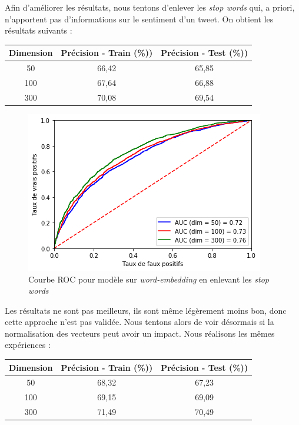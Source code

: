 \documentclass[11pt,french,french]{article}
\begin{document}
Afin d'améliorer les résultats, nous tentons d'enlever les \emph{stop
words} qui, a priori, n'apportent pas d'informations sur le sentiment
d'un tweet. On obtient les résultats suivants :

\begin{center}
\begin{tabular}{| c || c | c |}
\hline
Dimension & Précision - Train (\%)) & Précision - Test (\%)) \\ \hline
50 & 66,42 & 65,85 \\ \hline
100 & 67,64 & 66,88 \\ \hline
300 & 70,08 & 69,54 \\ \hline
\end{tabular}
\end{center}

\begin{figure}
\centering
\includegraphics{img/roc_word_st.png}
\caption{Courbe ROC pour modèle sur \emph{word-embedding} en enlevant
les \emph{stop words}}
\end{figure}

Les résultats ne sont pas meilleurs, ils sont même légèrement moins bon,
donc cette approche n'est pas validée. Nous tentons alors de voir
désormais si la normalisation des vecteurs peut avoir un impact. Nous
réalisons les mêmes expériences :

\begin{center}
\begin{tabular}{| c || c | c |}
\hline
Dimension & Précision - Train (\%)) & Précision - Test (\%)) \\ \hline
50 & 68,32 & 67,23 \\ \hline
100 & 69,15 & 69,09 \\ \hline
300 & 71,49 & 70,49 \\ \hline
\end{tabular}
\end{center}
\end{document}
